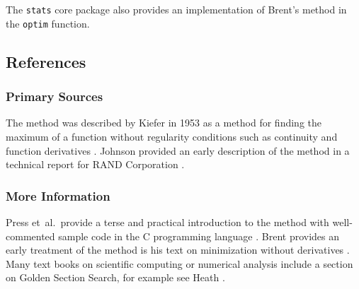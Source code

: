 The \texttt{stats} core package also provides an implementation of Brent's method in the \texttt{optim} function.

\subsection{References}

\subsubsection{Primary Sources}
The method was described by Kiefer in 1953 as a method for finding the maximum of a function without regularity conditions such as continuity and function derivatives \cite{Kiefer1953}.
Johnson provided an early description of the method in a technical report for RAND Corporation \cite{Johnson1955}.

\subsubsection{More Information}
Press et~al.\ provide a terse and practical introduction to the method with well-commented sample code in the C programming language \cite{Press2007}.
Brent provides an early treatment of the method is his text on minimization without derivatives \cite{Brent1973}.
Many text books on scientific computing or numerical analysis include a section on Golden Section Search, for example see Heath \cite{Heath2002}.

